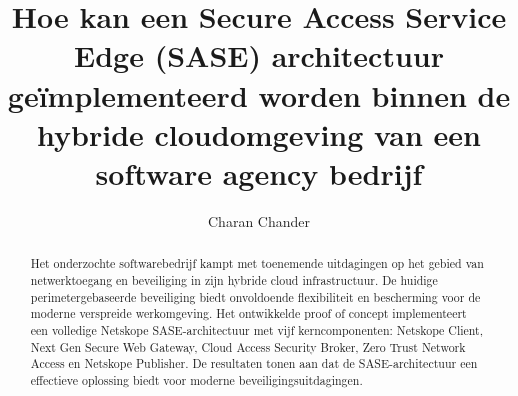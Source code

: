 \documentclass[a0,portrait]{hogent-poster}
\title{Hoe kan een Secure Access Service Edge (SASE) architectuur geïmplementeerd worden binnen de hybride cloudomgeving van een software agency bedrijf}
\author{Charan Chander}
\begin{document}
\maketitle

\begin{abstract}
  Het onderzochte softwarebedrijf kampt met toenemende uitdagingen op het gebied van netwerktoegang en beveiliging in zijn hybride cloud infrastructuur. De huidige perimetergebaseerde beveiliging biedt onvoldoende flexibiliteit en bescherming voor de moderne verspreide werkomgeving. Het ontwikkelde proof of concept implementeert een volledige Netskope SASE-architectuur met vijf kerncomponenten: Netskope Client, Next Gen Secure Web Gateway, Cloud Access Security Broker, Zero Trust Network Access en Netskope Publisher. De resultaten tonen aan dat de SASE-architectuur een effectieve oplossing biedt voor moderne beveiligingsuitdagingen.
\end{abstract}
\end{document}
